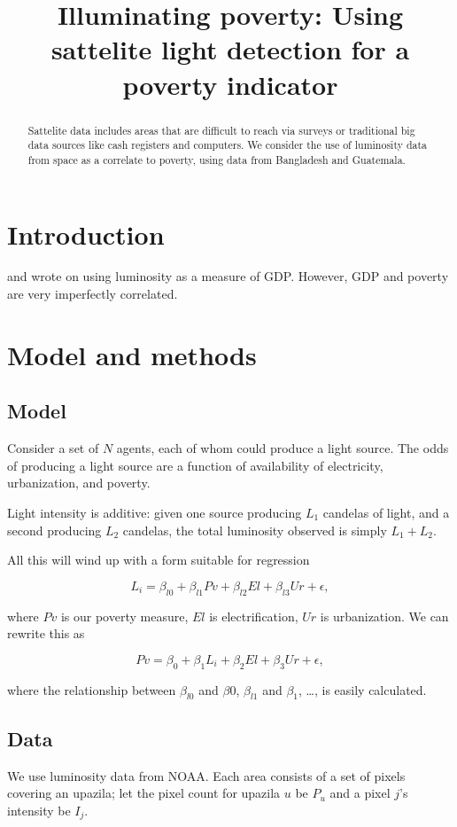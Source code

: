 \documentclass{article}
\begin{document}
\title{Illuminating poverty: Using sattelite light detection for a poverty indicator}
\maketitle
\begin{abstract}
Sattelite data includes areas that are difficult to reach via surveys or traditional big
data sources like cash registers and computers. We consider the use of luminosity data
from space as a correlate to poverty, using data from Bangladesh and Guatemala.
\end{abstract}

\section{Introduction}

\citet{chen:pnas} and \citet{henderson:nber} wrote on using luminosity as a measure of GDP. However, GDP and poverty are very imperfectly correlated.

\section{Model and methods}

\subsection{Model}
Consider a set of $N$ agents, each of whom could produce a light source. The odds of
producing a light source are a function of availability of electricity, urbanization, and poverty.

Light intensity is additive: given one source producing $L_1$ candelas of light, and a
second producing $L_2$ candelas, the total luminosity observed is simply $L_1+L_2$.

All this will wind up with a form suitable for regression 

$$L_i = \beta_{l0} + \beta_{l1} Pv + \beta_{l2} El + \beta_{l3} Ur + \epsilon,$$

where $Pv$ is our poverty measure, $El$ is electrification, $Ur$ is urbanization.
We can rewrite this as 

$$Pv = \beta_0 + \beta_1 L_i  + \beta_2 El + \beta_3 Ur + \epsilon,$$

where the relationship between $\beta_{l0}$ and $\beta{0}$, $\beta_{l1}$ and $\beta_1$, \dots, is easily calculated.

\subsection{Data}
We use luminosity data from NOAA. 
Each area consists of a set of pixels covering an upazila; let the pixel count for upazila
$u$ be $P_u$ and a pixel $j$'s intensity be $I_j$.
\end{document}
